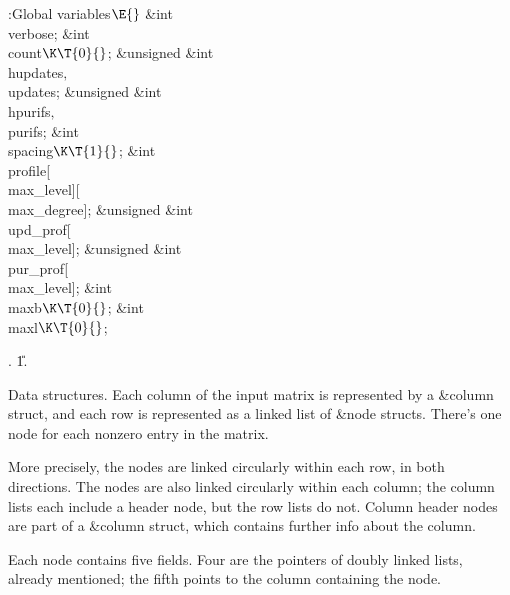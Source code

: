 \B{}:Global variables\X${}\E{}$\6
\&{int} \\{verbose};%
\6
\&{int} \\{count}${}\K\T{0}{}$;\6
\&{unsigned} \&{int} \\{hupdates}${},{}$ \\{updates};\6
\&{unsigned} \&{int} \\{hpurifs}${},{}$ \\{purifs};\6
\&{int} \\{spacing}${}\K\T{1}{}$;\6
\&{int} \\{profile}[\\{max\_level}][\\{max\_degree}];\6
\&{unsigned} \&{int} \\{upd\_prof}[\\{max\_level}];\6
\&{unsigned} \&{int} \\{pur\_prof}[\\{max\_level}];\6
\&{int} \\{maxb}${}\K\T{0}{}$;\6
\&{int} \\{maxl}${}\K\T{0}{}$;\par
{}.
\U1.\fi

Data structures.
Each column of the input matrix is represented by a \&{column} struct,
and each row is represented as a linked list of \&{node} structs. There's one
node for each nonzero entry in the matrix.

More precisely, the nodes are linked circularly within each row, in
both directions. The nodes are also linked circularly within each column;
the column lists each include a header node, but the row lists do not.
Column header nodes are part of a \&{column} struct, which
contains further info about the column.

Each node contains five fields. Four are the pointers of doubly linked lists,
already mentioned; the fifth points to the column containing the node.

